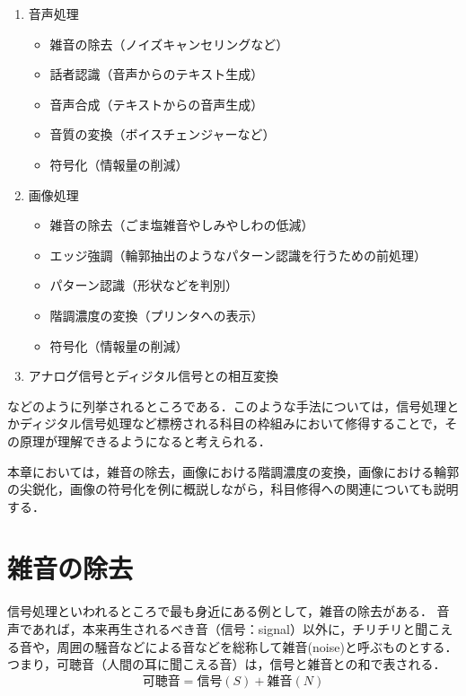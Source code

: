 \begin{enumerate}
\item 音声処理
\begin{itemize}
\item 雑音の除去（ノイズキャンセリングなど）
\item 話者認識（音声からのテキスト生成）
\item 音声合成（テキストからの音声生成）
\item 音質の変換（ボイスチェンジャーなど）
\item 符号化（情報量の削減）
\end{itemize}
\item 画像処理
\begin{itemize}
\item 雑音の除去（ごま塩雑音やしみやしわの低減）
\item エッジ強調（輪郭抽出のようなパターン認識を行うための前処理）
\item パターン認識（形状などを判別）
\item 階調濃度の変換（プリンタへの表示）
\item 符号化（情報量の削減）
\end{itemize}
\item アナログ信号とディジタル信号との相互変換
\end{enumerate}
などのように列挙されるところである．このような手法については，信号処理とかディジタル信号処理など標榜される科目の枠組みにおいて修得することで，その原理が理解できるようになると考えられる．

本章においては，雑音の除去，画像における階調濃度の変換，画像における輪郭の尖鋭化，画像の符号化を例に概説しながら，科目修得への関連についても説明する．



\section{雑音の除去}

信号処理といわれるところで最も身近にある例として，雑音の除去がある．
%
音声であれば，本来再生されるべき音（信号：signal）以外に，チリチリと聞こえる音や，周囲の騒音などによる音などを総称して雑音(noise)と呼ぶものとする．
%
つまり，可聴音（人間の耳に聞こえる音）は，信号と雑音との和で表される\footnotemark ．
\begin{equation}
可聴音=信号(S)+雑音(N)
\end{equation}

